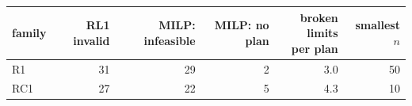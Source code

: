 \begin{tabular}{@{}lrrrrr@{}}
\toprule
family & RL1 invalid & MILP: infeasible & MILP: no plan & \shortstack[r]{broken limits\\per plan} & smallest $n$ \\
\midrule
R1 & 31 & 29 & 2 & 3.0 & 50 \\
RC1 & 27 & 22 & 5 & 4.3 & 10 \\
\bottomrule
\end{tabular}
